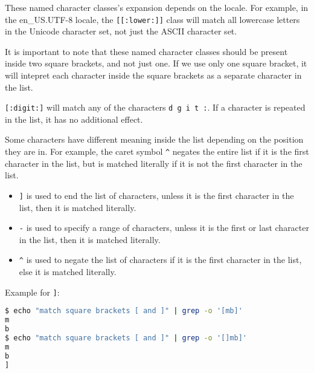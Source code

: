 These named character classes's expansion depends on the locale. For example, in the en\_US.UTF-8 locale, the \lstinline|[[:lower:]]| class will match all lowercase letters in the Unicode character set, not just the ASCII character set.

It is important to note that these named character classes should be present
inside two square brackets, and not just one. If we use only one square bracket,
it will intepret each character inside the square brackets as a separate character
in the list.

\lstinline|[:digit:]| will match any of the characters \lstinline|d g i t :|.
If a character is repeated in the list, it has no additional effect.

Some characters have different meaning inside the list depending on the
position they are in. For example, the caret symbol \lstinline|^| negates
the entire list if it is the first character in the list, but is matched
literally if it is not the first character in the list.

\begin{itemize}
  \item \lstinline|]| is used to end the list of characters, unless it is the first character in the list, then it is matched literally.
  \item \lstinline|-| is used to specify a range of characters, unless it is the first or last character in the list, then it is matched literally.
  \item \lstinline|^| is used to negate the list of characters if it is the first character in the list, else it is matched literally.
\end{itemize}

Example for \lstinline|]|:
\begin{lstlisting}[language=bash]
$ echo "match square brackets [ and ]" | grep -o '[mb]'
m
b
$ echo "match square brackets [ and ]" | grep -o '[]mb]'
m
b
]
\end{lstlisting}

